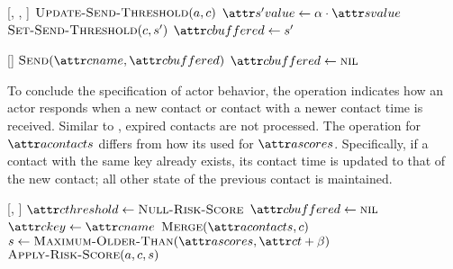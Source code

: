 \begin{function}{\nApplyRiskScore}[\vActor, \vContact, \vScore]
  \State $\cUpdateSendThreshold[\vActor, \vContact]$
  \If{$\aContactThresholdValue < \aScoreValue \AND \aContactTime + \pTimeBuffer > \aScoreTime$}
    \State $\aNewScoreValue \assign \pTransmissionRate \cdot \aScoreValue$
    \State $\cSetSendThreshold[\vContact, \vNewScore]$
    \If{$\aContactName \notEquals \aScoreSender$}
      \State $\aContactBuffered \assign \vNewScore$
    \EndIf
  \EndIf
\end{function}

\begin{function}{\nHandleFlushTimeout}[\vActor]
  \ForEach{$\vContact \in \aActorContacts$}
    \If{$\aContactBuffered \notEquals \nil$}
      \State $\cSend[\aContactName, \aContactBuffered]$
      \State $\aContactBuffered \assign \nil$
    \EndIf
  \EndFor
\end{function}

To conclude the specification of actor behavior, the \cHandleContact{} operation indicates how an actor responds when a new contact or contact with a newer contact time is received. Similar to \cHandleRiskScore{}, expired contacts are not processed. The \cMerge{} operation for $\aActorContacts$ differs from how its used for $\aActorScores$. Specifically, if a contact with the same key already exists, its contact time is updated to that of the new contact; all other state of the previous contact is maintained.

\begin{function}{\nHandleContact}[\vActor, \vContact]
    \State $\aContactThreshold \assign \cNullRiskScore$
    \State $\aContactBuffered \assign \nil$
    \State $\aContactKey \assign \aContactName$
    \State $\cMerge[\aActorContacts, \vContact]$
    \State $\vScore \assign \cMaximumOlderThan[\aActorScores, \aContactTime + \pTimeBuffer]$
    \State $\cApplyRiskScore[\vActor, \vContact, \vScore]$
  \EndIf
\end{function}



